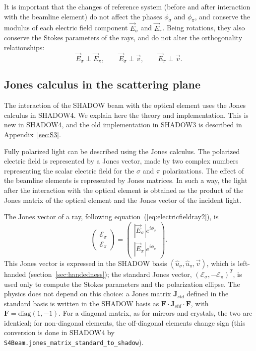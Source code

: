 \documentclass{iucr}
\begin{document}
It is important that the changes of reference system (before and after interaction with the beamline element) do not affect the phases $\phi_\sigma$ and $\phi_\pi$, and conserve the modulus of each electric field component $\vec{E}_\sigma$ and $\vec{E}_\pi$. Being rotations, they also conserve the Stokes parameters of the rays, and do not alter the orthogonality relationships:
\begin{equation}
\label{ortho}
\vec{E}_\sigma \perp \vec{E}_\pi, \qquad \vec{E}_\sigma \perp \vec{v}, \qquad \vec{E}_\pi \perp \vec{v}.
\end{equation}

\subsection{Jones calculus in the scattering plane}\label{sec:S4}

The interaction of the SHADOW beam with the optical element uses the Jones calculus \cite{Jones1941a, Jones1941b} in SHADOW4. We explain here the theory and implementation. This is new in SHADOW4, and the old implementation in SHADOW3 is described in Appendix~\ref{sec:S3}.

Fully polarized light can be described using the Jones calculus. The polarized electric field is represented by a Jones vector, made by two complex numbers representing the scalar electric field for the $\sigma$ and $\pi$ polarizations. 
The effect of the beamline elements is represented by Jones matrices.
In such a way, the light after the interaction with the optical element is obtained as the product of the Jones matrix of the optical element and the Jones vector of the incident light.

The Jones vector of a ray, following equation~(\ref{eq:electricfieldray2}), is
\begin{equation}
        \begin{pmatrix}
        \mathcal{E}_\sigma \\
        \mathcal{E}_\pi
    \end{pmatrix}
    =
    \begin{pmatrix}
        |\vec{E}_{\sigma}| e^{i \phi_\sigma} \\
        |\vec{E}_{\pi}| e^{i \phi_\pi}
    \end{pmatrix}.
\end{equation}
This Jones vector is expressed in the SHADOW basis $(\hat{u}_\sigma,\hat{u}_\pi,\vec{v})$, which is left-handed (section~\ref{sec:handedness}); the standard Jones vector, $(\mathcal{E}_\sigma,-\mathcal{E}_\pi)^T$, is used only to compute the Stokes parameters and the polarization ellipse. The physics does not depend on this choice: a Jones matrix $\textbf{J}_{std}$ defined in the standard basis is written in the SHADOW basis as $\textbf{F}\cdot\textbf{J}_{std}\cdot\textbf{F}$, with $\textbf{F}=\mathrm{diag}(1,-1)$. For a diagonal matrix, as for mirrors and crystals, the two are identical; for non-diagonal elements, the off-diagonal elements change sign (this conversion is done in SHADOW4 by {\tt S4Beam.jones\_matrix\_standard\_to\_shadow}).
\end{document}
